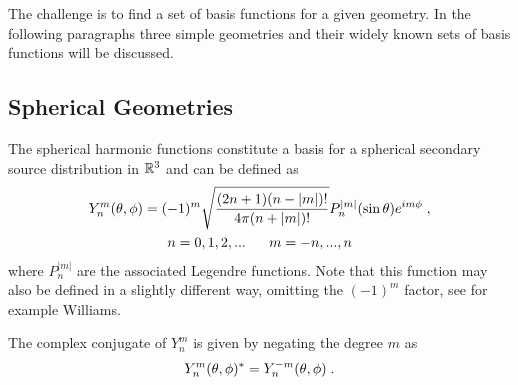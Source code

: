 The challenge is to find a set of basis functions for a given geometry. In
the following paragraphs three simple geometries and their widely known sets of basis
functions will be discussed.

\subsection{Spherical Geometries}
\label{sec:spherical_geometries}

The spherical
harmonic functions constitute a basis for a spherical secondary source distribution
in $\mathbb{R}^3$ and can be defined as\autocite[][(12.153), $\sin\theta$ is used here instead
of $\cos\theta$ due to the use of
another coordinate system, compare Figure\,2.1 from Gumerov and Duraiswami and
Figure\,\ref{fig:coordinate_system} in this thesis.]{Gumerov2004}
%
\begin{gather}
    Y_n^m(\theta,\phi) = (-1)^m \sqrt{\frac{(2n+1)(n-|m|)!}{4\pi(n+|m|)!}}
    P_n^{|m|}(\sin\theta) e^{im\phi} \qc
    \label{eq:Y} \\
    n = 0,1,2,... \;\;\;\;\;\; m = -n,...,n
    \notag
\end{gather}
%
where $P_n^{|m|}$ are the associated Legendre functions. Note that this function
may also be defined in a slightly different way, omitting the $(-1)^m$ factor,
see for example Williams.\autocite[][(6.20)]{Williams1999}

The complex conjugate of $Y_n^m$ is given by negating the degree $m$ as
%
\begin{equation}
    Y_n^m(\theta,\phi)^* = Y_n^{-m}(\theta,\phi) \qp
    \label{eq:Y_complex_conjugate}
\end{equation}
%

